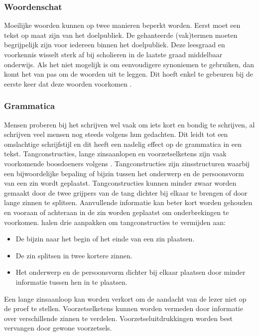 \subsubsection{Woordenschat}

Moeilijke woorden kunnen op twee manieren beperkt worden. Eerst moet een tekst op maat zijn van het doelpubliek. De gehanteerde (vak)termen moeten begrijpelijk zijn voor iedereen binnen het doelpubliek. Deze leesgraad en voorkennis wisselt sterk af bij scholieren in de laatste graad middelbaar onderwijs. Als het niet mogelijk is om eenvoudigere synoniemen te gebruiken, dan komt het van pas om de woorden uit te leggen. Dit hoeft enkel te gebeuren bij de eerste keer dat deze woorden voorkomen \autocite{Bosmans2022a, Bosmans2022b}.


\subsubsection{Grammatica}

Mensen proberen bij het schrijven wel vaak om iets kort en bondig te schrijven, al schrijven veel mensen nog steeds volgens hun gedachten. Dit leidt tot een omslachtige schrijfstijl en dit heeft een nadelig effect op de grammatica in een tekst. Tangconstructies, lange zinsaanlopen en voorzetselketens zijn vaak voorkomende boosdoeners volgens \textcite{Bosmans2022c}. Tangconstructies zijn zinsstructuren waarbij een bijwoordelijke bepaling of bijzin tussen het onderwerp en de persoonsvorm van een zin wordt geplaatst. Tangconstructies kunnen minder zwaar worden gemaakt door de twee grijpers van de tang dichter bij elkaar te brengen of door lange zinnen te splitsen. Aanvullende informatie kan beter kort worden gehouden en vooraan of achteraan in de zin worden geplaatst om onderbrekingen te voorkomen. \textcite{Rijnvis2020, Bosmans2022c} halen drie aanpakken om tangconstructies te vermijden aan:

\begin{itemize}
	\item De bijzin naar het begin of het einde van een zin plaatsen.
	\item De zin splitsen in twee kortere zinnen.
	\item Het onderwerp en de persoonsvorm dichter bij elkaar plaatsen door minder informatie tussen hen in te plaatsen.
\end{itemize}


Een lange zinsaanloop kan worden verkort om de aandacht van de lezer niet op de proef te stellen. Voorzetselketens kunnen worden vermeden door informatie over verschillende zinnen te verdelen. Voorzetseluitdrukkingen worden best vervangen door gewone voorzetsels.

